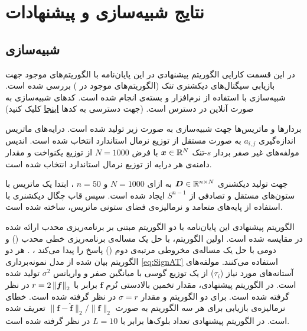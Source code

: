 \chapter{نتایج شبیه‌سازی و پیشنهادات}
\label{simulation}
\newpage

\section{شبیه‌سازی}
در این قسمت کارایی الگوریتم پیشنهادی در این پایان‌نامه با الگوریتم‌های موجود جهت بازیابی سیگنال‌های دیکشنری تنک  
(الگوریتم‌های موجود در 
\cite{Baraniuk2017})
بررسی شده است. شبیه‌سازی با استفاده از نرم‌افزار
و بسته‌ی 
انجام شده است. کد‌های شبیه‌سازی به صورت آنلاین در دسترس است. (جهت دسترسی به کد‌ها 
\href{https://gitlab.com/HosseinBeheshti/AdaptiveBDS}{اینجا}
کلیک کنید)

بردار‌ها و ماتریس‌ها جهت شبیه‌سازی به صورت زیر تولید شده است.
درایه‌‌های ماتریس اندازه‌گیری 
$ a_{i,j} $
به صورت مستقل از توزیع نرمال استاندارد انتخاب شده است. اندیس مولفه‌های غیر صفر بردار
$s$-تنک
$ \bm{x}\in \mathbb{R}^{N}  $
با فرض 
$ N=1000 $
از توزیع یکنواخت و مقدار دامنه‌ی هر درایه از توزیع نرمال استاندارد انتخاب شده است.

جهت تولید دیکشنری 
$ \bm{D}\in \mathbb{R}^{n\times N} $
به ازای
$ N=1000$
و
$n=50 $
، ابتدا یک ماتریس با ستون‌های مستقل و تصادفی از 
$ S^{n-1} $
ایجاد شده است. سپس قاب چگال دیکشنری با استفاده از پایه‌های متعامد و نرمالیزه‌ی فضای ستونی ماتریس، ساخته شده است.


الگوریتم پیشنهادی این پایان‌نامه با دو الگوریتم مبتنی بر برنامه‌ریزی محدب ارائه شده در 
\cite{Baraniuk2017}
مقایسه شده است. اولین الگوریتم، با حل یک مساله‌ی برنامه‌ریزی خطی محدب
()
و دومی با حل یک مساله‌ی مخروطی مرتبه‌ی دوم
()
پاسخ را پیدا می‌کند
\cite[بخش ~]{Baraniuk2017}،
\cite[بخش ~]{Baraniuk2017}.
هر دو الگوریتم بیان شده از مدل نمونه‌برداری
\eqref{eq:SignAT}
استفاده می‌کنند.
مولفه‌های آستانه‌های مورد نیاز
($ \tau_{i} $) 
از یک توزیع گوسی با میانگین صفر و واریانس 
$ \sigma^{2} $
تولید شده است. 
در الگوریتم پیشنهادی، مقدار تخمین بالادستی نُرم
$ \bm{f} $
برابر با
$ r= 2\left\lVert\bm{f}\right\rVert_{2} $
در نظر گرفته شده است.  برای دو الگوریتم
و
مقدار
$ \sigma=r $
در نظر گرفته شده است.
خطای نرمالیزه‌ی بازیابی برای هر سه الگوریتم به صورت 
$ \|\bm{f}-\hat{\bm{f}}\|_{2} /\|\bm{f}\|_{2} $
تعریف شده است. در الگوریتم پیشنهادی تعداد بلوک‌ها برابر با 
$ L=10 $
در نظر گرفته شده است.


